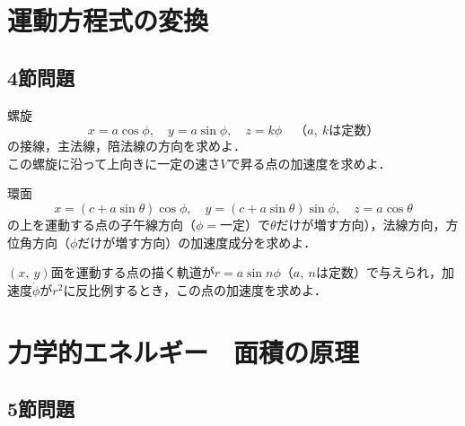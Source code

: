 \section{運動方程式の変換}
\subsection{4節問題}

\begin{enumerate}[label=\textbf{[\arabic*]}, labelsep=10pt, leftmargin=23pt]
	\item 螺旋
		\begin{equation*}
			x = a\cos \phi,\quad y = a\sin\phi,\quad z = k\phi \quad \text{（$a,\ k$は定数）}
		\end{equation*}
		の接線，主法線，陪法線の方向を求めよ．\\
		この螺旋に沿って上向きに一定の速さ$V$で昇る点の加速度を求めよ．
	\item 環面
		\begin{equation*}
			x = (c + a\sin\theta)\cos\phi,\quad y = (c + a\sin\theta)\sin\phi,\quad z = a\cos\theta
		\end{equation*}
		の上を運動する点の子午線方向（$\phi = \text{一定}$）で$\theta$だけが増す方向），法線方向，方位角方向（$\phi$だけが増す方向）の加速度成分を求めよ．
	\item $(x,\ y)$面を運動する点の描く軌道が$r = a\sin n\phi$（$a,\ n$は定数）で与えられ，加速度$\dot{\phi}$が$r^2$に反比例するとき，この点の加速度を求めよ．
\end{enumerate}



\section{力学的エネルギー　面積の原理}
\subsection{5節問題}

